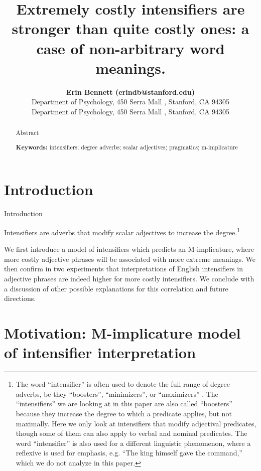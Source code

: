 \documentclass[10pt,letterpaper]{article}
\title{Extremely costly intensifiers are stronger than quite costly ones: a case of non-arbitrary word meanings.}
\author{{\large \bf Erin Bennett (erindb@stanford.edu)} \\
  Department of Psychology, 450 Serra Mall , Stanford, CA 94305
  \AND {\large \bf Noah Goodman (ngoodman@stanford.edu)} \\
  Department of Psychology, 450 Serra Mall , Stanford, CA 94305}
\begin{document}
\maketitle

\begin{abstract}

Abstract

\textbf{Keywords:} 
intensifiers; degree adverbs; scalar adjectives; pragmatics; m-implicature
\end{abstract}

\section{Introduction}

Introduction

Intensifiers are adverbs that modify scalar adjectives to increase the degree.\footnote{The word ``intensifier'' is often used to denote the full range of degree adverbs, be they ``boosters'', ``minimizers'', or ``maximizers'' \cite{quirk}. The ``intensifiers'' we are looking at in this paper are also called ``boosters'' because they increase the degree to which a predicate applies, but not maximally. Here we only look at intensifiers that modify adjectival predicates, though some of them can also apply to verbal and nominal predicates. The word ``intensifier'' is also used for a different linguistic phenomenon, where a reflexive is used for emphasis, e.g. ``The king himself gave the command,'' which we do not analyze in this paper.}


We first introduce a model of intensifiers which predicts an M-implicature, where more costly adjective phrases will be associated with more extreme meanings. We then confirm in two experiments that interpretations of English intensifiers in adjective phrases are indeed higher for more costly intensifiers. We conclude with a discussion of other possible explanations for this correlation and future directions.

\section{Motivation: M-implicature model of intensifier interpretation}

\end{document}
